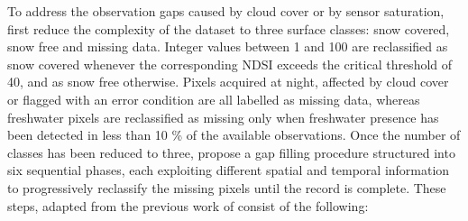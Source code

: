 To address the observation gaps caused by cloud cover or by sensor saturation, \textcite{MODIS_GAR} first reduce the complexity of the dataset to three 
surface classes: snow covered, snow free and missing data. Integer values between 1 and 100 are reclassified as snow covered 
whenever the corresponding NDSI exceeds the critical threshold of 40, and as snow free otherwise. Pixels acquired at night, 
affected by cloud cover or flagged with an error condition are all labelled as missing data, whereas freshwater pixels are 
reclassified as missing only when freshwater presence has been detected in less than 10 \% of the available observations. Once the 
number of classes has been reduced to three, \textcite{MODIS_GAR} propose a gap filling procedure structured into six sequential phases, 
each exploiting different spatial and temporal information to progressively reclassify the missing pixels until the record is 
complete. These steps, adapted from the previous work of \textcite{no_cloud_MODIS} consist of the following:
